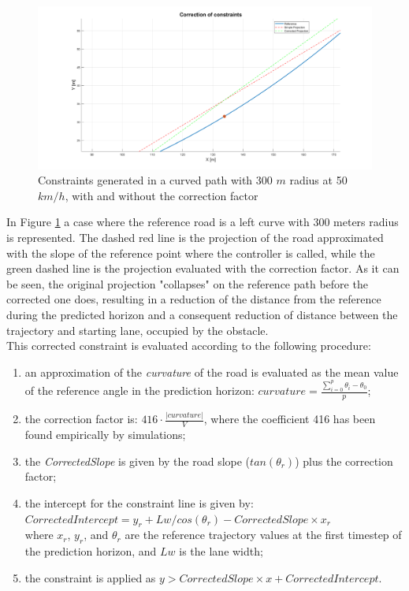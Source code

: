 \begin{figure}[H]
    \centering
    \includegraphics[width=1\textwidth]{Figures/ConstraintCorrection.png}
    \caption{Constraints generated in a curved path with 300 $m$ radius at 50 $km/h$, with and without the correction factor}
      \label{fig:CorrectionConstraint}
\end{figure}
In Figure \ref{fig:CorrectionConstraint} a case where the reference road is a left curve with 300 meters radius is represented. The dashed red line is the projection of the road approximated with the slope of the reference point where the controller is called, while the green dashed line is the projection evaluated with the correction factor. As it can be seen, the original projection "collapses" on the reference path before the corrected one does, resulting in a reduction of the distance from the reference during the predicted horizon and a consequent reduction of distance between the trajectory and starting lane, occupied by the obstacle.\\
This corrected constraint is evaluated according to the following procedure:
\begin{enumerate}
    \item an approximation of the \textit{curvature} of the road is evaluated as the mean value of the reference angle in the prediction horizon: $curvature = \frac{\sum_{i=0}^{p}\theta_i-\theta_0}{p}$;
    \item the correction factor is: $416\cdot\frac{|curvature|}{V}$, where the coefficient 416 has been found empirically by simulations;
    \item the \textit{CorrectedSlope} is given by the road slope ($tan(\theta_r)$) plus the correction factor;
    \item the intercept for the constraint line is given by:\\
    $CorrectedIntercept = y_r + Lw/cos(\theta_r) - CorrectedSlope\times x_r$\\
    where $x_r$, $y_r$, and $\theta_r$ are the reference trajectory values at the first timestep of the prediction horizon, and $Lw$ is the lane width;
    \item the constraint is applied as $y > CorrectedSlope\times x + CorrectedIntercept$.
\end{enumerate}
